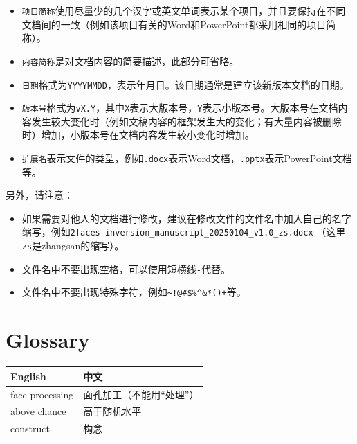 \documentclass[]{ctexbook}
\providecommand{\tightlist}{%
  \setlength{\itemsep}{0pt}\setlength{\parskip}{0pt}}
\theoremstyle{definition}
\theoremstyle{definition}
\theoremstyle{definition}
\theoremstyle{definition}
\theoremstyle{remark}
\begin{document}
\begin{itemize}
\tightlist
\item
  \texttt{项目简称}使用尽量少的几个汉字或英文单词表示某个项目，并且要保持在不同文档间的一致（例如该项目有关的Word和PowerPoint都采用相同的项目简称）。
\item
  \texttt{内容简称}是对文档内容的简要描述，此部分可省略。
\item
  \texttt{日期}格式为\texttt{YYYYMMDD}，表示年月日。该日期通常是建立该新版本文档的日期。
\item
  \texttt{版本号}格式为\texttt{vX.Y}，其中\texttt{X}表示大版本号，\texttt{Y}表示小版本号。大版本号在文档内容发生较大变化时（例如文稿内容的框架发生大的变化；有大量内容被删除时）增加，小版本号在文档内容发生较小变化时增加。
\item
  \texttt{扩展名}表示文件的类型，例如\texttt{.docx}表示Word文档，\texttt{.pptx}表示PowerPoint文档等。
\end{itemize}

另外，请注意：

\begin{itemize}
\tightlist
\item
  如果需要对他人的文档进行修改，建议在修改文件的文件名中加入自己的名字缩写，例如\texttt{2faces-inversion\_manuscript\_20250104\_v1.0\_zs.docx} （这里\texttt{zs}是zhangsan的缩写）。
\item
  文件名中不要出现空格，可以使用短横线\texttt{-}代替。
\item
  文件名中不要出现特殊字符，例如\texttt{\textasciitilde{}!@\#\$\%\^{}\&*()+}等。
\end{itemize}

\chapter{Glossary}\label{glossary}

\begin{longtable}[]{@{}ll@{}}
\toprule\noalign{}
English & 中文 \\
\midrule\noalign{}
\endhead
\bottomrule\noalign{}
\endlastfoot
face processing & 面孔加工（不能用``处理''） \\
above chance & 高于随机水平 \\
construct & 构念 \\
\end{longtable}



\backmatter
\printindex
\end{document}
